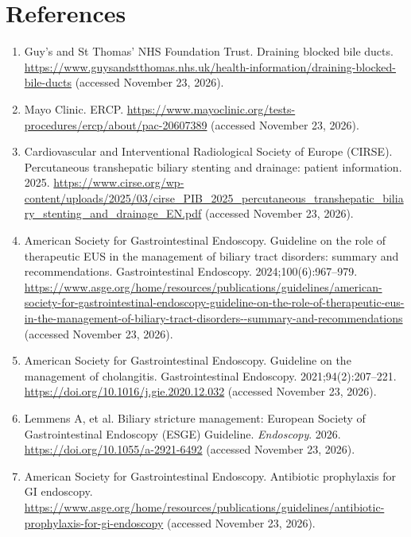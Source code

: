 \section*{References}
\begin{enumerate}
  \item Guy's and St Thomas' NHS Foundation Trust. Draining blocked bile ducts. \url{https://www.guysandstthomas.nhs.uk/health-information/draining-blocked-bile-ducts} (accessed November 23, 2026).
  \item Mayo Clinic. ERCP. \url{https://www.mayoclinic.org/tests-procedures/ercp/about/pac-20607389} (accessed November 23, 2026).
  \item Cardiovascular and Interventional Radiological Society of Europe (CIRSE). Percutaneous transhepatic biliary stenting and drainage: patient information. 2025. \url{https://www.cirse.org/wp-content/uploads/2025/03/cirse_PIB_2025_percutaneous_transhepatic_biliary_stenting_and_drainage_EN.pdf} (accessed November 23, 2026).
  \item American Society for Gastrointestinal Endoscopy. Guideline on the role of therapeutic EUS in the management of biliary tract disorders: summary and recommendations. Gastrointestinal Endoscopy. 2024;100(6):967--979. \url{https://www.asge.org/home/resources/publications/guidelines/american-society-for-gastrointestinal-endoscopy-guideline-on-the-role-of-therapeutic-eus-in-the-management-of-biliary-tract-disorders--summary-and-recommendations} (accessed November 23, 2026).
  \item American Society for Gastrointestinal Endoscopy. Guideline on the management of cholangitis. Gastrointestinal Endoscopy. 2021;94(2):207--221. \url{https://doi.org/10.1016/j.gie.2020.12.032} (accessed November 23, 2026).
  \item Lemmens A, et al. Biliary stricture management: European Society of Gastrointestinal Endoscopy (ESGE) Guideline. \textit{Endoscopy}. 2026. \url{https://doi.org/10.1055/a-2921-6492} (accessed November 23, 2026).
  \item American Society for Gastrointestinal Endoscopy. Antibiotic prophylaxis for GI endoscopy. \url{https://www.asge.org/home/resources/publications/guidelines/antibiotic-prophylaxis-for-gi-endoscopy} (accessed November 23, 2026).
\end{enumerate}

\clearpage
